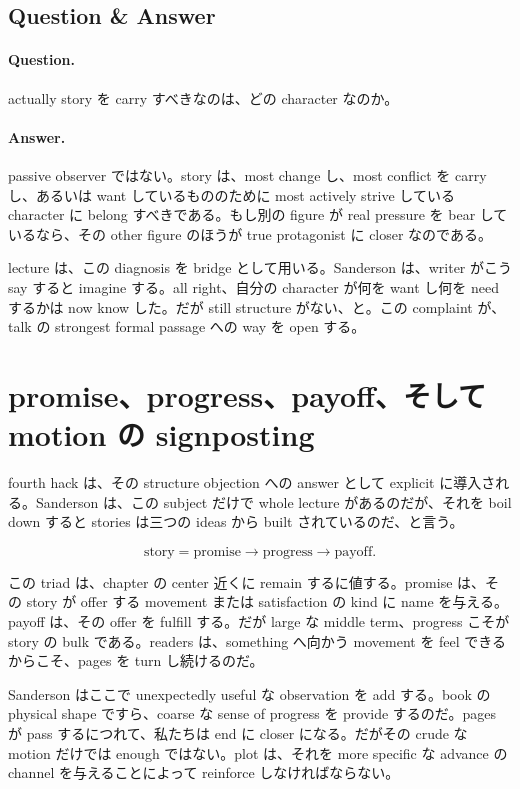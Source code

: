 \subsection{Question \& Answer}

\paragraph{Question.} actually story を carry すべきなのは、どの character なのか。

\paragraph{Answer.} passive observer ではない。story は、most change し、most conflict を carry し、あるいは want しているもののために most actively strive している character に belong すべきである。もし別の figure が real pressure を bear しているなら、その other figure のほうが true protagonist に closer なのである。

lecture は、この diagnosis を bridge として用いる。Sanderson は、writer がこう say すると imagine する。all right、自分の character が何を want し何を need するかは now know した。だが still structure がない、と。この complaint が、talk の strongest formal passage への way を open する。

\section{promise、progress、payoff、そして motion の signposting}

fourth hack は、その structure objection への answer として explicit に導入される。Sanderson は、この subject だけで whole lecture があるのだが、それを boil down すると stories は三つの ideas から built されているのだ、と言う。

\begin{equation}
\text{story} = \text{promise} \to \text{progress} \to \text{payoff}.
\end{equation}

この triad は、chapter の center 近くに remain するに値する。promise は、その story が offer する movement または satisfaction の kind に name を与える。payoff は、その offer を fulfill する。だが large な middle term、progress こそが story の bulk である。readers は、something へ向かう movement を feel できるからこそ、pages を turn し続けるのだ。

Sanderson はここで unexpectedly useful な observation を add する。book の physical shape ですら、coarse な sense of progress を provide するのだ。pages が pass するにつれて、私たちは end に closer になる。だがその crude な motion だけでは enough ではない。plot は、それを more specific な advance の channel を与えることによって reinforce しなければならない。

